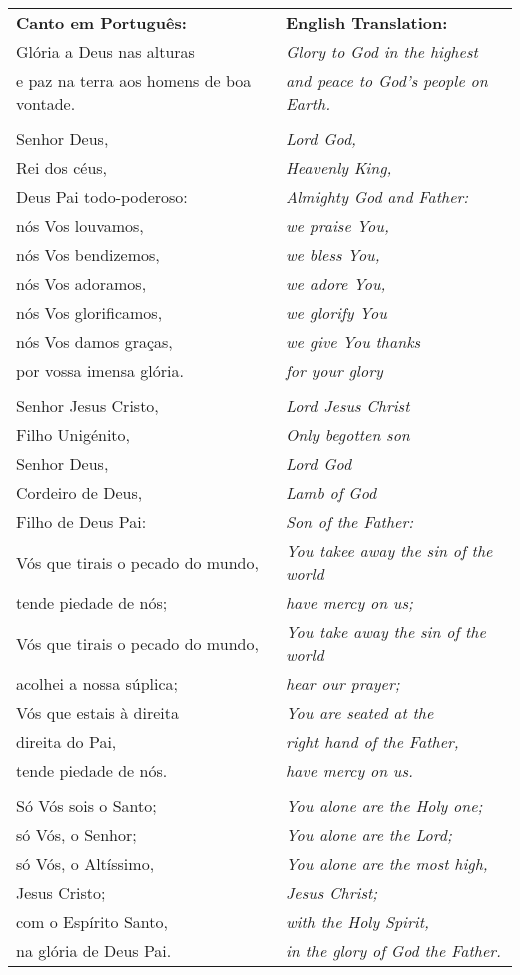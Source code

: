 \begin{longtable}{L{2in}R{2in}}
{\bf Canto em Português:} & {\bf English Translation:}\\
  Glória a Deus nas alturas & {\it Glory to God in the highest}\\
  e paz na terra aos homens de boa vontade. & {\it and peace to God's people on Earth.}\\
  &\\
  Senhor Deus, & {\it Lord God,}\\
  Rei dos céus, & {\it Heavenly King,}\\
  Deus Pai todo-poderoso: & {\it Almighty God and Father:}\\
  nós Vos louvamos, & {\it we praise You,}\\
  nós Vos bendizemos, & {\it we bless You,}\\
  nós Vos adoramos, & {\it we adore You,}\\
  nós Vos glorificamos,& {\it we glorify You}\\
  nós Vos damos graças, & {\it we give You thanks}\\
  por vossa imensa glória. & {\it for your glory}\\
  &\\
  Senhor Jesus Cristo, & {\it Lord Jesus Christ}\\ 
  Filho Unigénito, & {\it Only begotten son}\\
  Senhor Deus, & {\it Lord God}\\
  Cordeiro de Deus, & {\it Lamb of God}\\ 
  Filho de Deus Pai: & {\it Son of the Father:}\\
  Vós que tirais o pecado do mundo, & {\it You takee away the sin of the world}\\ 
  tende piedade de nós; & {\it have mercy on us;}\\
  Vós que tirais o pecado do mundo, & {\it You take away the sin of the world}\\ 
  acolhei a nossa súplica; & {\it hear our prayer;}\\
  Vós que estais à direita & {\it You are seated at the}\\
  direita do Pai, & {\it right hand of the Father,}\\
  tende piedade de nós. & {\it have mercy on us.}\\
  &\\
  Só Vós sois o Santo; & {\it You alone are the Holy one;}\\
  só Vós, o Senhor; & {\it You alone are the Lord;}\\
  só Vós, o Altíssimo,& {\it You alone are the most high,}\\
  Jesus Cristo; & {\it Jesus Christ;}\\
  com o Espírito Santo,  & {\it with the Holy Spirit,}\\
  na glória de Deus Pai. & {\it in the glory of God the Father.}\\

\end{longtable}

